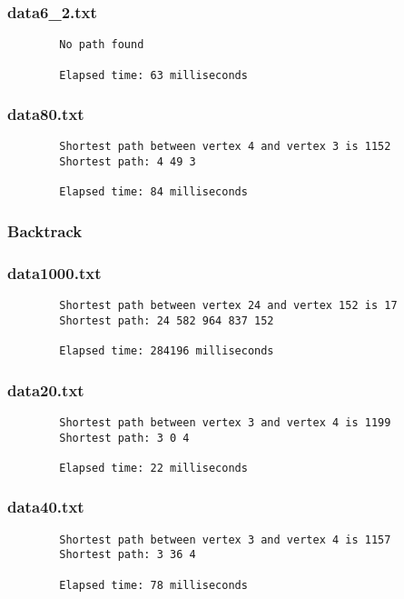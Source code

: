 \documentclass{article}
\begin{document}
    \subsubsection*{data6\_2.txt}
    \begin{verbatim}
        No path found

        Elapsed time: 63 milliseconds
    \end{verbatim}

    \subsubsection*{data80.txt}
    \begin{verbatim}
        Shortest path between vertex 4 and vertex 3 is 1152
        Shortest path: 4 49 3

        Elapsed time: 84 milliseconds
    \end{verbatim}

    \subsubsection{Backtrack}
    \subsubsection*{data1000.txt}
    \begin{verbatim}
        Shortest path between vertex 24 and vertex 152 is 17
        Shortest path: 24 582 964 837 152

        Elapsed time: 284196 milliseconds
    \end{verbatim}

    \subsubsection*{data20.txt}
    \begin{verbatim}
        Shortest path between vertex 3 and vertex 4 is 1199
        Shortest path: 3 0 4

        Elapsed time: 22 milliseconds
    \end{verbatim}

    \subsubsection*{data40.txt}
    \begin{verbatim}
        Shortest path between vertex 3 and vertex 4 is 1157
        Shortest path: 3 36 4

        Elapsed time: 78 milliseconds
    \end{verbatim}
\end{document}
